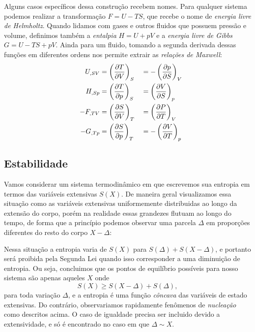 Alguns casos específicos dessa construção recebem nomes. Para qualquer sistema
podemos realizar a transformação $F=U-TS$, que recebe o nome de \emph{energia
livre de Helmholtz}. Quando lidamos com gases e outros fluidos que possuem
pressão e volume, definimos também a \emph{entalpia} $H=U+pV$ e a \emph{energia
livre de Gibbs} $G=U-TS+pV$. Ainda para um fluido, tomando a segunda derivada
dessas funções em diferentes ordens nos permite extrair as \emph{relações de
Maxwell}:
\begin{alignat*}{3}
    &&U_{,SV}&=\pd{T}{V}{S}&&=-\pd{p}{S}{V}\\
    &&H_{,Sp}&=\pd{T}{p}{S}&&=\pd{V}{S}{p}\\
    &&-F_{,TV}&=\pd{S}{V}{T}&&=\pd{P}{T}{V}\\
    &&-G_{,Tp}&=\pd{S}{p}{T}&&=-\pd{V}{T}{p}
\end{alignat*}

\subsection{Estabilidade}

Vamos considerar um sistema termodinâmico em que escrevemos sua entropia em
termos das variáveis extensivas $S(X)$. De maneira geral visualizamos essa
situação como as variáveis extensivas uniformemente distribuidas ao longo da
extensão do corpo, porém na realidade essas grandezes flutuam ao longo do tempo,
de forma que a princípio podemos observar uma parcela $\Delta$ em proporções
diferentes do resto do corpo $X-\Delta$:
\begin{figure}[H]
    \centering
\end{figure}
Nessa situação a entropia varia de $S(X)$ para $S(\Delta)+S(X-\Delta)$, e
portanto será proibida pela Segunda Lei quando isso corresponder a uma
diminuição de entropia. Ou seja, concluimos que os pontos de equilíbrio
possíveis para nosso sistema são apenas aqueles $X$ onde
$$S(X)\geq S(X-\Delta)+S(\Delta),$$
para toda variação $\Delta$, e a entropia é uma função \emph{côncava} das
variáveis de estado extensivas. Do contrário, observariamos rapidamente
fenômenos de \emph{nucleação} como descritos acima. O caso de igualdade precisa
ser incluido devido a extensividade, e só é encontrado no caso em que $\Delta
\sim X$.

